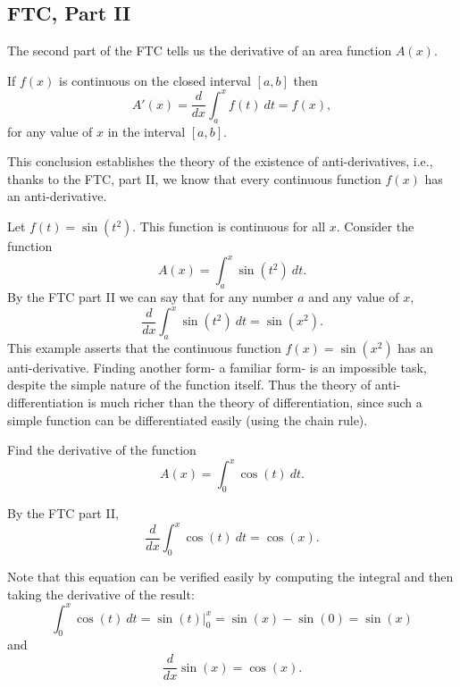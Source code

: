 \documentclass{ximera}
\begin{document}
\subsection{FTC, Part II}

The second part of the FTC tells us the derivative of an area function $A(x)$.  


\begin{theorem}
If $f(x)$ is continuous on the closed interval $[a, b]$ then 
\[A'(x) = \frac{d}{dx}\int_a^x f(t) \ dt = f(x), \]
for any value of $x$ in the interval $[a, b]$.
\end{theorem}

This conclusion establishes the theory of the existence of anti-derivatives, i.e., thanks to the FTC, part II, we know that every continuous function $f(x)$ has an anti-derivative. 




\begin{example} Let $f(t) = \sin(t^2)$.  This function is continuous for all $x$.  Consider the function
\[A(x) = \int_a^x \sin(t^2) \ dt.\]
By the FTC part II
we can say that for any number $a$ and any value of $x$, 
\[\frac{d}{dx}\int_a^x \sin(t^2) \ dt = \sin(x^2).\]
This example asserts that the continuous function $f(x) = \sin(x^2)$ has an anti-derivative.  
Finding another form- a familiar form- is an impossible task, despite the simple nature of the function itself.  
Thus the theory of anti-differentiation is much richer than the theory of differentiation, 
since such a simple function can be differentiated easily (using the chain rule).
\end{example}


\begin{example}
Find the derivative of the function
\[A(x) = \int_0^x \cos(t) \ dt.\]

By the FTC part II,
\[\frac{d}{dx}\int_0^x \cos(t) \ dt = \cos(x).\]
 
Note that this equation can be verified easily by computing the integral and then taking the derivative of the result:
\[\int_0^x \cos(t) \ dt = \sin(t) \Big|_0^x = \sin(x) - \sin(0) = \sin(x)\]
and 
\[\frac{d}{dx} \sin(x) = \cos(x).\]
\end{example}
\end{document}

